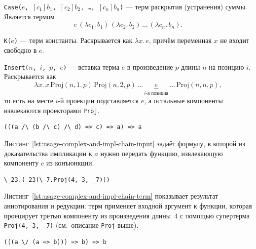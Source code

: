 \documentclass[14pt, russian]{scrartcl}
\begin{document}
\texttt{Case($e$, $[c_1]b_1$, $[c_2]b_2$, \ldots, $[c_n]b_n$)} --- терм
  раскрытия (устранения) суммы. Является термом
  \[
    e\,(\lambda c_1.\, b_1)\,(\lambda c_2.\, b_2)\,\ldots\,(\lambda c_n.\, b_n).
  \]

\texttt{K($e$)} --- терм константы. Раскрывается как $\lambda x.\, e$,
  причём переменная $x$ не входит свободно в $e$.

\texttt{Insert($n$, $i$, $p$, $e$)} --- вставка терма $e$ в произведение
  $p$ длины $n$ на позицию $i$. Раскрывается как
  \[
    \lambda x.\, x\,\mathrm{Proj}(n, 1, p)\,\mathrm{Proj}(n, 2, p)\,\ldots\,
    \underbrace{e}_{i\text{-я позиция}}\,\ldots\,\mathrm{Proj}(n, n, p),
  \]
  то есть на месте $i$-й проекции подставляется $e$, а остальные компоненты
  извлекаются проекторами \texttt{Proj}.

\begin{listing}[!htb]
\caption{Входная формула \texttt{complex-and-impl-chain.txt}}
\label{lst:usage-complex-and-impl-chain-input}
\begin{verbatim}
(((a /\ (b /\ c) /\ d) => c) => a) => a
\end{verbatim}
\end{listing}

Листинг~\ref{lst:usage-complex-and-impl-chain-input} задаёт формулу, в которой из
доказательства импликации к $a$ нужно передать функцию, извлекающую компоненту
$c$ из конъюнкции.

\begin{listing}[!htb]
\caption{Редуцированный терм для \texttt{complex-and-impl-chain.txt}}
\label{lst:usage-complex-and-impl-chain-term}
\begin{verbatim}
\_23.(_23(\_7.Proj(4, 3, _7)))
\end{verbatim}
\end{listing}

Листинг~\ref{lst:usage-complex-and-impl-chain-term} показывает результат
аннотирования и редукции: терм применяет входной аргумент к функции, которая
проецирует третью компоненту из произведения длины~$4$ с помощью супертерма
\texttt{Proj(4, 3, \_7)} (см.~описание \texttt{Proj} выше).

\begin{listing}[!htb]
\caption{Входная формула \texttt{complex-impl-disjunction.txt}}
\label{lst:usage-complex-impl-disjunction-input}
\begin{verbatim}
(((a \/ (a => b))) => b) => b
\end{verbatim}
\end{listing}
\end{document}
